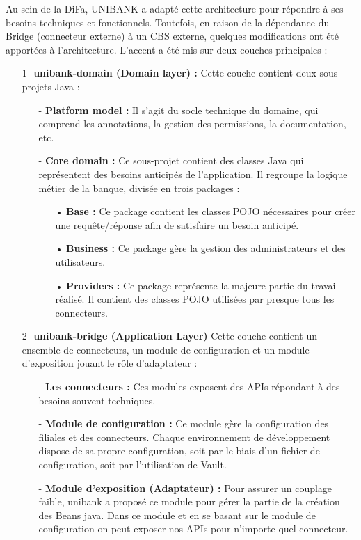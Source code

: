 Au sein de la DiFa, UNIBANK a adapté cette architecture pour répondre à ses besoins techniques et fonctionnels. Toutefois, en raison de la dépendance du Bridge (connecteur externe) à un CBS externe, quelques modifications ont été apportées à l'architecture. L'accent a été mis sur deux couches principales :

\begin{itemize}
    \item[1-] \textbf{unibank-domain (Domain layer) :} Cette couche contient deux sous-projets Java :
    \begin{itemize}
        \item[-] \textbf{Platform model :} Il s'agit du socle technique du domaine, qui comprend les annotations, la gestion des permissions, la documentation, etc.
        \item[-] \textbf{Core domain :}  Ce sous-projet contient des classes Java qui représentent des besoins anticipés de l'application. Il regroupe la logique métier de la banque, divisée en trois packages :
        \begin{itemize}
            \item[•] \textbf{Base :} Ce package contient les classes POJO nécessaires pour créer une requête/réponse afin de satisfaire un besoin anticipé.
            \item[•] \textbf{Business :} Ce package gère la gestion des administrateurs et des utilisateurs.
            \item[•] \textbf{Providers :} Ce package représente la majeure partie du travail réalisé. Il contient des classes POJO utilisées par presque tous les connecteurs.
        \end{itemize}
    \end{itemize}
    \item[2-] \textbf{unibank-bridge (Application Layer)} Cette couche contient un ensemble de connecteurs, un module de configuration et un module d'exposition jouant le rôle d'adaptateur :
    \begin{itemize}
        \item[-] \textbf{Les connecteurs :} Ces modules exposent des APIs répondant à des besoins souvent techniques.
        \item[-] \textbf{Module de configuration :} Ce module gère la configuration des filiales et des connecteurs. Chaque environnement de développement dispose de sa propre configuration, soit par le biais d'un fichier de configuration, soit par l'utilisation de Vault.
        \item[-] \textbf{Module d'exposition (Adaptateur) :} Pour assurer un couplage faible, unibank a proposé ce module pour gérer la partie de la création des Beans java. Dans ce module et en se basant sur le module de configuration on peut exposer nos APIs pour n’importe
        quel connecteur.
    \end{itemize}
\end{itemize}

